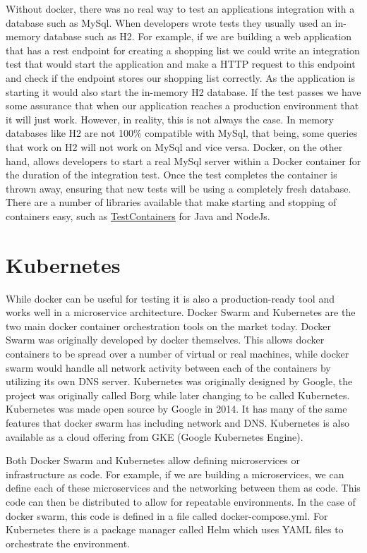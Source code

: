 Without docker, there was no real way to test an applications integration with a database such as MySql. When developers wrote tests they usually used an in-memory database such as H2. For example, if we are building a web application that has a rest endpoint for creating a shopping list we could write an integration test that would start the application and make a HTTP request to this endpoint and check if the endpoint stores our shopping list correctly. As the application is starting it would also start the in-memory H2 database. If the test passes we have some assurance that when our application reaches a production environment that it will just work. However, in reality, this is not always the case. In memory databases like H2 are not 100\% compatible with MySql, that being, some queries that work on H2 will not work on MySql and vice versa. Docker, on the other hand, allows developers to start a real MySql server within a Docker container for the duration of the integration test. Once the test completes the container is thrown away, ensuring that new tests will be using a completely fresh database. There are a number of libraries available that make starting and stopping of containers easy, such as \href{https://www.testcontainers.org/}{TestContainers} for Java and NodeJs.

\section{Kubernetes}

While docker can be useful for testing it is also a production-ready tool and works well in a microservice architecture. Docker Swarm and Kubernetes are the two main docker container orchestration tools on the market today. Docker Swarm was originally developed by docker themselves. This allows docker containers to be spread over a number of virtual or real machines, while docker swarm would handle all network activity between each of the containers by utilizing its own DNS server. Kubernetes was originally designed by Google, the project was originally called Borg while later changing to be called Kubernetes. Kubernetes was made open source by Google in 2014. It has many of the same features that docker swarm has including network and DNS. Kubernetes is also available as a cloud offering from GKE (Google Kubernetes Engine). 

Both Docker Swarm and Kubernetes allow defining microservices or infrastructure as code. For example, if we are building a microservices, we can define each of these microservices and the networking between them as code. This code can then be distributed to allow for repeatable environments. In the case of docker swarm, this code is defined in a file called docker-compose.yml. For Kubernetes there is a package manager called Helm which uses YAML files to orchestrate the environment.

